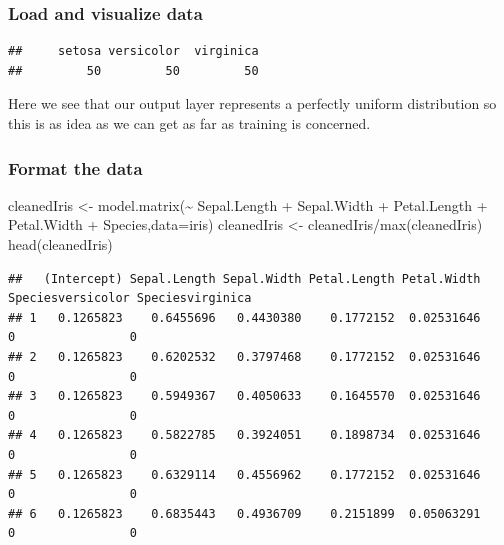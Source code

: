 \documentclass[
]{article}
\newenvironment{Shaded}{\begin{snugshade}}{\end{snugshade}}
\newcommand{\AttributeTok}[1]{\textcolor[rgb]{0.77,0.63,0.00}{#1}}
\newcommand{\CommentTok}[1]{\textcolor[rgb]{0.56,0.35,0.01}{\textit{#1}}}
\newcommand{\FunctionTok}[1]{\textcolor[rgb]{0.00,0.00,0.00}{#1}}
\newcommand{\NormalTok}[1]{#1}
\newcommand{\OtherTok}[1]{\textcolor[rgb]{0.56,0.35,0.01}{#1}}
\newcommand{\SpecialCharTok}[1]{\textcolor[rgb]{0.00,0.00,0.00}{#1}}
\begin{document}
\hypertarget{load-and-visualize-data}{%
\subsubsection{Load and visualize data}\label{load-and-visualize-data}}

\begin{Shaded}
\end{Shaded}

\begin{verbatim}
##     setosa versicolor  virginica 
##         50         50         50
\end{verbatim}

Here we see that our output layer represents a perfectly uniform
distribution so this is as idea as we can get as far as training is
concerned.

\hypertarget{format-the-data}{%
\subsubsection{Format the data}\label{format-the-data}}

\begin{Shaded}
\begin{Highlighting}[]
\NormalTok{cleanedIris }\OtherTok{\textless{}{-}} \FunctionTok{model.matrix}\NormalTok{(}\SpecialCharTok{\textasciitilde{}}\NormalTok{ Sepal.Length }\SpecialCharTok{+}\NormalTok{ Sepal.Width }\SpecialCharTok{+}\NormalTok{ Petal.Length }\SpecialCharTok{+}\NormalTok{ Petal.Width }\SpecialCharTok{+}\NormalTok{ Species,}\AttributeTok{data=}\NormalTok{iris)}
\NormalTok{cleanedIris }\OtherTok{\textless{}{-}}\NormalTok{ cleanedIris}\SpecialCharTok{/}\FunctionTok{max}\NormalTok{(cleanedIris)}
\FunctionTok{head}\NormalTok{(cleanedIris)}
\end{Highlighting}
\end{Shaded}

\begin{verbatim}
##   (Intercept) Sepal.Length Sepal.Width Petal.Length Petal.Width Speciesversicolor Speciesvirginica
## 1   0.1265823    0.6455696   0.4430380    0.1772152  0.02531646                 0                0
## 2   0.1265823    0.6202532   0.3797468    0.1772152  0.02531646                 0                0
## 3   0.1265823    0.5949367   0.4050633    0.1645570  0.02531646                 0                0
## 4   0.1265823    0.5822785   0.3924051    0.1898734  0.02531646                 0                0
## 5   0.1265823    0.6329114   0.4556962    0.1772152  0.02531646                 0                0
## 6   0.1265823    0.6835443   0.4936709    0.2151899  0.05063291                 0                0
\end{verbatim}
\end{document}
